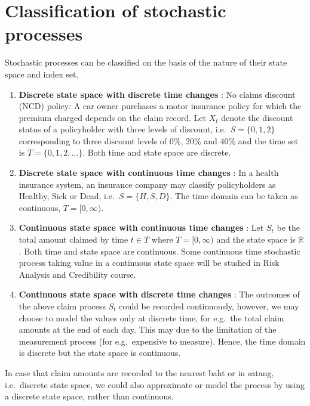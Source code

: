 \documentclass[
]{book}
\theoremstyle{definition}
\theoremstyle{definition}
\theoremstyle{definition}
\theoremstyle{definition}
\theoremstyle{remark}
\begin{document}
\hypertarget{classification-of-stochastic-processes}{%
\section{Classification of stochastic processes}\label{classification-of-stochastic-processes}}

Stochastic processes can be classified on the basis of the nature of
their state space and index set.

\begin{enumerate}
\def\labelenumi{\arabic{enumi}.}
\item
  \textbf{Discrete state space with discrete time changes} : No claims
  discount (NCD) policy: A car owner purchases a motor insurance
  policy for which the premium charged depends on the claim record.
  Let \(X_t\) denote the discount status of a policyholder with three
  levels of discount, i.e.~\(S = \{0,1,2\}\) corresponding to three
  discount levels of 0\%, 20\% and 40\% and the time set is
  \(T = \{0,1,2,\ldots\}\). Both time and state space are discrete.
\item
  \textbf{Discrete state space with continuous time changes} : In a health
  insurance system, an insurance company may classify policyholders as
  Healthy, Sick or Dead, i.e.~\(S = \{H, S, D\}\). The time domain can
  be taken as continuous, \(T = [0,\infty)\).
\item
  \textbf{Continuous state space with continuous time changes} : Let \(S_t\)
  be the total amount claimed by time \(t \in T\) where \(T = [0,\infty)\)
  and the state space is \(\mathbb{R}\). Both time and state space are
  continuous. Some continuous time stochastic process taking value in
  a continuous state space will be studied in Risk Analysis and
  Credibility course.
\item
  \textbf{Continuous state space with discrete time changes} : The outcomes
  of the above claim process \(S_t\) could be recorded continuously,
  however, we may choose to model the values only at discrete time,
  for e.g.~the total claim amounts at the end of each day. This may
  due to the limitation of the measurement process (for e.g.~expensive
  to measure). Hence, the time domain is discrete but the state space
  is continuous.
\end{enumerate}

In case that claim amounts are recorded to the nearest baht or in
satang, i.e.~discrete state space, we could also approximate or model
the process by using a discrete state space, rather than continuous.
\end{document}
